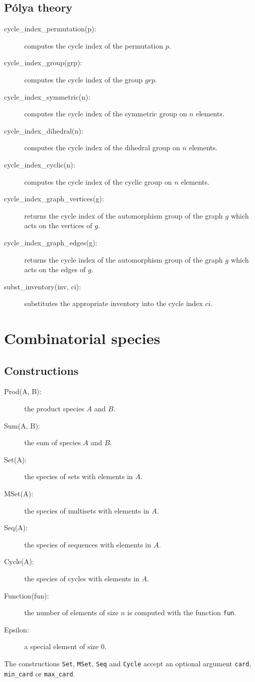 \documentclass[11pt]{article}
\begin{document}
\subsection{P\'olya theory}

\begin{description}
  \item [cycle\_index\_permutation(p):] computes the cycle index of
    the permutation $p$.
  \item [cycle\_index\_group(grp):] computes the cycle index of the
    group $grp$.
  \item [cycle\_index\_symmetric(n):] computes the cycle index of the
    symmetric group on $n$ elements.
  \item [cycle\_index\_dihedral(n):] computes the cycle index of the
    dihedral group on $n$ elements.
  \item [cycle\_index\_cyclic(n):] computes the cycle index of the
    cyclic group on $n$ elements.
  \item [cycle\_index\_graph\_vertices(g):] returns the cycle index of
    the automorphism group of the graph $g$ which acts on the vertices
    of $g$.
  \item [cycle\_index\_graph\_edges(g):] returns the cycle index of
    the automorphism group of the graph $g$ which acts on the edges of
    $g$.
  \item [subst\_inventory(inv, ci):] substitutes the appropriate
    inventory into the cycle index $ci$.
\end{description}

\section{Combinatorial species}

\subsection{Constructions}
\begin{description}
  \item[Prod(A, B):] the product species $A$ and $B$.
  \item[Sum(A, B):] the sum of species $A$ and $B$.
  \item[Set(A):] the species of sets with elements in $A$.
  \item[MSet(A):] the species of multisets with elements in $A$.
  \item[Seq(A):] the species of sequences with elements in $A$.
  \item[Cycle(A):] the species of cycles with elements in $A$.
  \item[Function(fun):] the number of elements of size $n$ is computed
    with the function \texttt{fun}.
  \item[Epsilon:] a special element of size 0.
\end{description}
%
The constructions \texttt{Set}, \texttt{MSet}, \texttt{Seq} and
\texttt{Cycle} accept an optional argument \texttt{card},
\texttt{min\_card} or \texttt{max\_card}.
\end{document}
